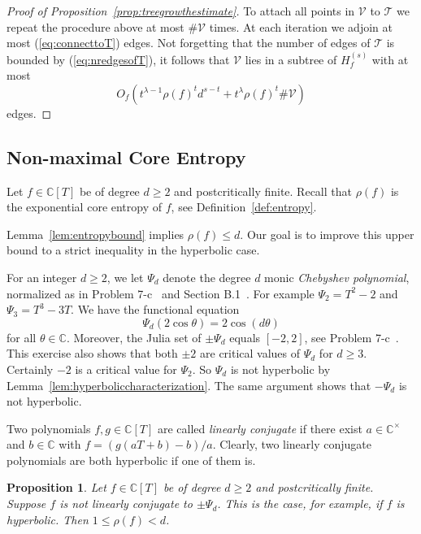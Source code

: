 \documentclass[12pt,oneside,a4]{amsart}
\newcommand{\IC}{\mathbb{C}}
\newcommand{\cV}{\mathcal{V}}
\newcommand{\cT}{\mathcal{T}}
\newcounter{maincounter}
\numberwithin{maincounter}{section}
\numberwithin{equation}{section}
\newtheorem{propo}[maincounter]{Proposition}
\begin{document}
\begin{proof}[Proof of Proposition~\ref{prop:treegrowthestimate}]
  To  attach all points
  in $\cV$ to $\cT$
  we repeat the procedure above at most $\#\cV$ times. At each iteration we
  adjoin at most
  (\ref{eq:connecttoT}) edges. 
  Not forgetting that the  number of edges of $\cT$ is bounded by  (\ref{eq:nredgesofT}),
  it follows that $\cV$ lies in a subtree of
  $H_f^{(s)}$ with at most
  \begin{equation*}
    O_f \left(t^{\lambda-1} \rho(f)^{t} d^{s-t}+ t^{\lambda} \rho(f)^t
      \#\cV \right)
  \end{equation*}
  edges.
\end{proof}


\subsection{Non-maximal Core Entropy}
\label{sec:nonmaxentropy}

Let $f\in \IC[T]$ be of degree $d \ge 2$ and postcritically finite.
Recall that $\rho(f)$ is the exponential core entropy of $f$, see
Definition~\ref{def:entropy}.

Lemma~\ref{lem:entropybound} implies  $ \rho(f) \le d$.
Our goal is to improve this upper bound to a strict inequality
in the hyperbolic case. 

For an integer $d\ge 2$, we let $\Psi_d$ denote the degree $d$ monic
\textit{Chebyshev polynomial}, normalized as in Problem
7-c~\cite{Milnor} and Section B.1~\cite{Milnor:pasting}.
For example $\Psi_2 = T^2-2$ and $\Psi_3=T^3-3T$. We have the functional
equation
\begin{equation}
  \label{eq:chebynorm}
  \Psi_d (2\cos \theta) = 2\cos(d \theta) 
\end{equation}
for all $\theta\in\IC$. 
Moreover,  the Julia set of $\pm \Psi_d$ equals $[-2,2]$, see
Problem 7-c~\cite{Milnor}.
This exercise also shows that both $\pm 2$ are critical values of
$\Psi_d$ for $d\ge 3$. Certainly $-2$ is a critical value for
$\Psi_2$. So $\Psi_d$ is not hyperbolic by Lemma~\ref{lem:hyperboliccharacterization}.
The same argument shows that $-\Psi_d$ is not hyperbolic. 


Two polynomials $f,g\in\IC[T]$ are
called \textit{linearly conjugate}
if there exist $a\in\IC^\times$ and $b\in\IC$ with $f = (g(aT+b)-b)/a$.
Clearly, two linearly conjugate polynomials are both hyperbolic if one
of them is. 

\begin{propo}
  \label{prop:rhoflessthand}
  Let $f\in\IC[T]$ be of degree $d \ge 2$ and postcritically finite.
  Suppose $f$ is not linearly conjugate to $\pm \Psi_d$. This is the
  case, for example, if
  $f$ is hyperbolic. Then $1\le \rho(f)<d$.
\end{propo}
\end{document}
